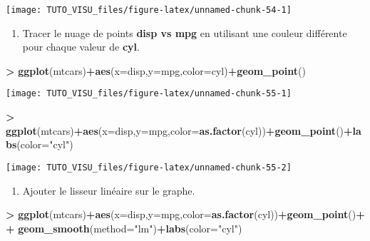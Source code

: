 \documentclass[]{book}
\newenvironment{Shaded}{\begin{snugshade}}{\end{snugshade}}
\newcommand{\DataTypeTok}[1]{\textcolor[rgb]{0.13,0.29,0.53}{#1}}
\newcommand{\KeywordTok}[1]{\textcolor[rgb]{0.13,0.29,0.53}{\textbf{#1}}}
\newcommand{\NormalTok}[1]{#1}
\newcommand{\OperatorTok}[1]{\textcolor[rgb]{0.81,0.36,0.00}{\textbf{#1}}}
\newcommand{\StringTok}[1]{\textcolor[rgb]{0.31,0.60,0.02}{#1}}
\providecommand{\tightlist}{%
  \setlength{\itemsep}{0pt}\setlength{\parskip}{0pt}}
\theoremstyle{definition}
\theoremstyle{definition}
\theoremstyle{definition}
\theoremstyle{remark}
\begin{document}
\begin{center}\texttt{[image: TUTO\_VISU\_files/figure-latex/unnamed-chunk-54-1]} \end{center}

\begin{enumerate}
\def\labelenumi{\arabic{enumi}.}
\setcounter{enumi}{3}
\tightlist
\item
  Tracer le nuage de points \textbf{disp vs mpg} en utilisant une couleur différente pour chaque valeur de \textbf{cyl}.
\end{enumerate}

\begin{Shaded}
\begin{Highlighting}[]
\OperatorTok{>}\StringTok{ }\KeywordTok{ggplot}\NormalTok{(mtcars)}\OperatorTok{+}\KeywordTok{aes}\NormalTok{(}\DataTypeTok{x=}\NormalTok{disp,}\DataTypeTok{y=}\NormalTok{mpg,}\DataTypeTok{color=}\NormalTok{cyl)}\OperatorTok{+}\KeywordTok{geom_point}\NormalTok{()}
\end{Highlighting}
\end{Shaded}

\begin{center}\texttt{[image: TUTO\_VISU\_files/figure-latex/unnamed-chunk-55-1]} \end{center}

\begin{Shaded}
\begin{Highlighting}[]
\OperatorTok{>}\StringTok{ }\KeywordTok{ggplot}\NormalTok{(mtcars)}\OperatorTok{+}\KeywordTok{aes}\NormalTok{(}\DataTypeTok{x=}\NormalTok{disp,}\DataTypeTok{y=}\NormalTok{mpg,}\DataTypeTok{color=}\KeywordTok{as.factor}\NormalTok{(cyl))}\OperatorTok{+}\KeywordTok{geom_point}\NormalTok{()}\OperatorTok{+}\KeywordTok{labs}\NormalTok{(}\DataTypeTok{color=}\StringTok{"cyl"}\NormalTok{)}
\end{Highlighting}
\end{Shaded}

\begin{center}\texttt{[image: TUTO\_VISU\_files/figure-latex/unnamed-chunk-55-2]} \end{center}

\begin{enumerate}
\def\labelenumi{\arabic{enumi}.}
\setcounter{enumi}{4}
\tightlist
\item
  Ajouter le lisseur linéaire sur le graphe.
\end{enumerate}

\begin{Shaded}
\begin{Highlighting}[]
\OperatorTok{>}\StringTok{ }\KeywordTok{ggplot}\NormalTok{(mtcars)}\OperatorTok{+}\KeywordTok{aes}\NormalTok{(}\DataTypeTok{x=}\NormalTok{disp,}\DataTypeTok{y=}\NormalTok{mpg,}\DataTypeTok{color=}\KeywordTok{as.factor}\NormalTok{(cyl))}\OperatorTok{+}\KeywordTok{geom_point}\NormalTok{()}\OperatorTok{+}
\OperatorTok{+}\StringTok{   }\KeywordTok{geom_smooth}\NormalTok{(}\DataTypeTok{method=}\StringTok{"lm"}\NormalTok{)}\OperatorTok{+}\KeywordTok{labs}\NormalTok{(}\DataTypeTok{color=}\StringTok{"cyl"}\NormalTok{)}
\end{Highlighting}
\end{Shaded}
\end{document}
